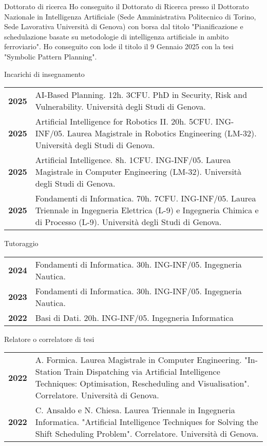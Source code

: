 \documentclass{resume} %
\begin{document}
\begin{rSection}{Dottorato di ricerca}
	Ho conseguito il Dottorato di Ricerca presso il Dottorato Nazionale in Intelligenza Artificiale (Sede Amministrativa Politecnico di Torino, Sede Lavorativa Università di Genova) con borsa dal titolo "Pianificazione e schedulazione basate su metodologie di intelligenza artificiale in ambito ferroviario". Ho conseguito con lode il titolo il 9 Gennaio 2025 con la tesi "Symbolic Pattern Planning".
\end{rSection}
\begin{rSection}{Incarichi  di insegnamento}
	\begin{tabularx}{0.95\textwidth} {lp{14cm}}
 \textbf{2025} & AI-Based Planning. 12h. 3CFU. PhD in Security, Risk and Vulnerability. Università degli Studi di Genova.  \\
 \textbf{2025} & Artificial Intelligence for Robotics II. 20h. 5CFU. ING-INF/05. Laurea Magistrale in Robotics Engineering (LM-32). Università degli Studi di Genova.  \\
  \textbf{2025} & Artificial Intelligence. 8h. 1CFU. ING-INF/05. Laurea Magistrale in Computer Engineering (LM-32). Università degli Studi di Genova.  \\
  \textbf{2025} & Fondamenti di Informatica. 70h. 7CFU. ING-INF/05. Laurea Triennale in Ingegneria Elettrica (L-9) e Ingegneria Chimica e di Processo (L-9). Università degli Studi di Genova.  \\
\end{tabularx}
\end{rSection}
\begin{rSection}{Tutoraggio}
	\begin{tabularx}{0.95\textwidth} {lp{14cm}}
 \textbf{2024} & Fondamenti di Informatica. 30h. ING-INF/05. Ingegneria Nautica.  \\
 \textbf{2023} & Fondamenti di Informatica. 30h. ING-INF/05. Ingegneria Nautica.  \\
 \textbf{2022} & Basi di Dati. 20h. ING-INF/05. Ingegneria Informatica \end{tabularx}
\end{rSection}
\pagebreak
\begin{rSection}{Relatore o correlatore di tesi}
	\begin{tabularx}{0.95\textwidth} {lp{14cm}}
 \textbf{2022} & A. Formica. Laurea Magistrale in Computer Engineering. "In-Station Train Dispatching via Artificial Intelligence Techniques: Optimisation, Rescheduling and Visualisation". Correlatore. Università di Genova.  \\
 \textbf{2022} & C. Ansaldo e N. Chiesa. Laurea Triennale in Ingegneria Informatica. "Artificial Intelligence Techniques for Solving the Shift Scheduling Problem". Correlatore. Università di Genova.
 \end{tabularx}
\end{rSection}
\end{document}
